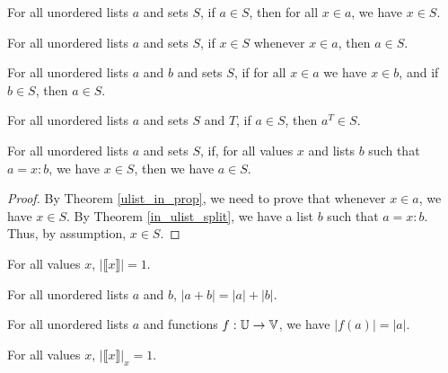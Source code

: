 \documentclass[../math.tex]{subfiles}
\begin{document}
\begin{theorem} \label{ulist_prop_in}
    For all unordered lists $a$ and sets $S$, if $a \in S$, then for all $x \in
    a$, we have $x \in S$.
\end{theorem}

\begin{theorem} \label{ulist_in_prop}
    For all unordered lists $a$ and sets $S$, if $x \in S$ whenever $x \in a$,
    then $a \in S$.
\end{theorem}

\begin{theorem} \label{ulist_prop_in_sub}
    For all unordered lists $a$ and $b$ and sets $S$, if for all $x \in a$ we
    have $x \in b$, and if $b \in S$, then $a \in S$.
\end{theorem}

\begin{theorem} \label{ulist_prop_other_filter}
    For all unordered lists $a$ and sets $S$ and $T$, if $a \in S$, then $a^T
    \in S$.
\end{theorem}

\begin{theorem} \label{ulist_prop_split}
    For all unordered lists $a$ and sets $S$, if, for all values $x$ and lists
    $b$ such that $a = x : b$, we have $x \in S$, then we have $a \in S$.
\end{theorem}
\begin{proof}
    By Theorem \ref{ulist_in_prop}, we need to prove that whenever $x \in a$, we
    have $x \in S$.  By Theorem \ref{in_ulist_split}, we have a list $b$ such
    that $a = x : b$.  Thus, by assumption, $x \in S$.
\end{proof}

\begin{theorem}
    For all values $x$, $|\llbracket x\rrbracket| = 1$.
\end{theorem}

\begin{theorem} \label{ulist_size_conc}
    For all unordered lists $a$ and $b$, $|a + b| = |a| + |b|$.
\end{theorem}

\begin{theorem} \label{ulist_image_size}
    For all unordered lists $a$ and functions $f : \mathbb{U} \to \mathbb{V}$, we have $|f(a)| =
    |a|$.
\end{theorem}

\begin{theorem}
    For all values $x$, $|\llbracket x\rrbracket |_x = 1$.
\end{theorem}
\end{document}
